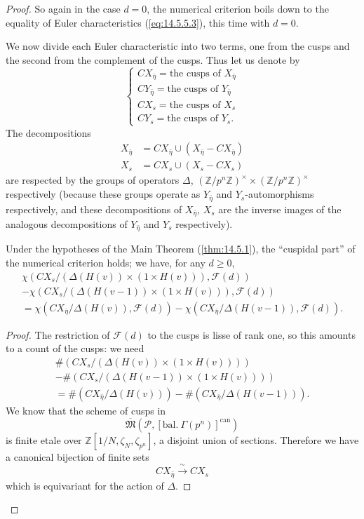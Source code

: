 \begin{proof}
So again in the case $d = 0$, the numerical criterion boils down to the equality of Euler characteristics (\ref{eq:14.5.5.3}), this time with $d = 0$.

\kmitem\label{item:14.5.6} We now divide each Euler characteristic into two terms, one from the cusps and the second from the complement of the cusps. Thus let us denote by
\[
\begin{cases}
CX_{\bar{\eta}} = \text{the cusps of } X_{\bar{\eta}} \\[4pt]
CY_{\bar{\eta}} = \text{the cusps of } Y_{\bar{\eta}} \\[4pt]
CX_s = \text{the cusps of } X_s \\[4pt]
CY_s = \text{the cusps of } Y_s .
\end{cases}
\]
The decompositions
\begin{align*}
X_{\bar{\eta}} &= CX_{\bar{\eta}} \cup (X_{\bar{\eta}} - CX_{\bar{\eta}}) \\
X_s &= CX_s \cup (X_s - CX_s)
\end{align*}
are respected by the groups of operators $\Delta$, $(\mathbb{Z}/p^n\mathbb{Z})^\times \times (\mathbb{Z}/p^n\mathbb{Z})^\times$ respectively (because these groups operate as $Y_{\bar{\eta}}$ and $Y_s$-automorphisms respectively, and these decompositions of $X_{\bar{\eta}}$, $X_s$ are the inverse images of the analogous decompositions of $Y_{\bar{\eta}}$ and $Y_s$ respectively).

\begin{proposition}\label{prop:14.5.7}
Under the hypotheses of the Main Theorem (\ref{thm:14.5.1}), the ``cuspidal part'' of the numerical criterion holds; we have, for any $d \ge 0$,
\begin{multline*}
\chi(CX_s / (\Delta(H(v)) \times (1 \times H(v))), \mathcal{F}(d)) \\
- \chi(CX_s / (\Delta(H(v-1)) \times (1 \times H(v))), \mathcal{F}(d)) \\
= \chi(CX_{\bar{\eta}} / \Delta(H(v)), \mathcal{F}(d)) - \chi(CX_{\bar{\eta}} / \Delta(H(v-1)), \mathcal{F}(d)) .
\end{multline*}
\end{proposition}

\begin{proof}
The restriction of $\mathcal{F}(d)$ to the cusps is lisse of rank one, so this amounts to a count of the cusps: we need
\begin{multline}\label{eq:14.5.7.1}
\#(CX_s / (\Delta(H(v)) \times (1 \times H(v)))) \\
- \#(CX_s / (\Delta(H(v-1)) \times (1 \times H(v)))) \\
= \#(CX_{\bar{\eta}} / \Delta(H(v))) - \#(CX_{\bar{\eta}} / \Delta(H(v-1))) .
\end{multline}
We know that the scheme of cusps in
\[
\overline{\mathfrak{M}}(\mathcal{P}, [\mathrm{bal.}\ \Gamma(p^n)]^{\mathrm{can}})
\]
is finite etale over $\mathbb{Z}[1/N, \zeta_N, \zeta_{p^n}]$, a disjoint union of sections. Therefore we have a canonical bijection of finite sets
\[
CX_{\bar{\eta}} \xrightarrow{\ \sim\ } CX_s
\]
which is equivariant for the action of $\Delta$.


\end{proof}
\end{proof}
